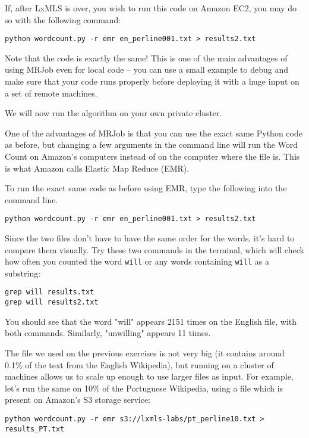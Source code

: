 If, after LxMLS is over, you wish to run this code on Amazon EC2, you may do so with the following command:

\begin{verbatim}
python wordcount.py -r emr en_perline001.txt > results2.txt
\end{verbatim}

Note that the code is exactly the same! This is one of the main advantages of using MRJob even for local code -- you can use a small example to debug and make sure that your code runs properly before deploying it with a huge input on a set of remote machines.

\iffalse
We will now run the algorithm on your own private cluster.

One of the advantages of MRJob is that you can use the exact same Python code
as before, but changing a few arguments in the command line will run the Word
Count on Amazon's computers instead of on the computer where the file is. This
is what Amazon calls Elastic Map Reduce (EMR).

To run the exact same code as before using EMR, type the following into the command line.

\begin{verbatim}
python wordcount.py -r emr en_perline001.txt > results2.txt
\end{verbatim}

Since the two files don't have to have the same order for the words, it's hard to compare them visually. Try these two commands in the terminal, which will check how often you counted the word \texttt{will} or any words containing \texttt{will} as a substring:

\begin{verbatim}
grep will results.txt
grep will results2.txt
\end{verbatim}

You should see that the word "will" appears 2151 times on the English file, with both commands. Similarly, "unwilling" appears 11 times.

The file we used on the previous exercises is not very big (it contains around 0.1\% of the text from the English Wikipedia), but running on a cluster of machines allows us to
scale up enough to use larger files as input. For example, let's run the same on 10\% of the Portuguese Wikipedia, using a file which is present on Amazon's S3 storage service:

\begin{verbatim}
python wordcount.py -r emr s3://lxmls-labs/pt_perline10.txt > results_PT.txt
\end{verbatim}

